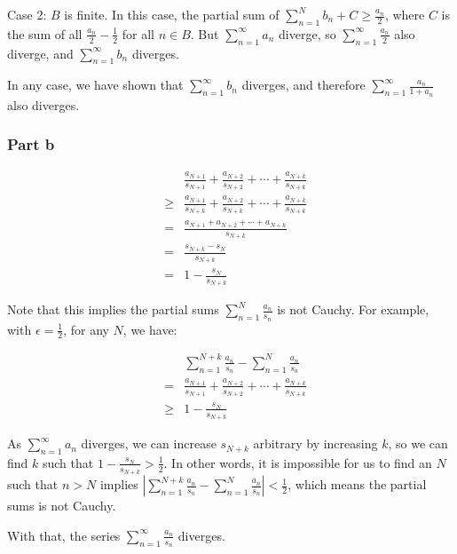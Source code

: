 Case 2: $ B $ is finite. In this case, the partial sum of $ \sum\limits_{n=1}^{N} b_n + C \ge \frac{a_n}{2} $, where $ C $ is the sum of all $ \frac{a_n}{2} - \frac{1}{2} $ for all $ n \in B $. But $  \sum\limits_{n=1}^{\infty} a_n $ diverge, so $  \sum\limits_{n=1}^{\infty} \frac{a_n}{2} $ also diverge, and $ \sum\limits_{n=1}^{\infty} b_n $ diverges.

In any case, we have shown that $ \sum\limits_{n=1}^{\infty} b_n $ diverges, and therefore $ \sum\limits_{n=1}^{\infty} \frac{a_n}{1 + a_n} $ also diverges.

\subsubsection*{Part b}
\begin{eqnarray*}
  &   & \frac{a_{N+1}}{s_{N+1}} + \frac{a_{N+2}}{s_{N+2}} + \cdots + \frac{a_{N+k}}{s_{N+k}} \\
  &\ge& \frac{a_{N+1}}{s_{N+k}} + \frac{a_{N+2}}{s_{N+k}} + \cdots + \frac{a_{N+k}}{s_{N+k}} \\
  & = & \frac{a_{N+1} + a_{N+2} + \cdots + a_{N+k}}{s_{N+k}} \\
  & = & \frac{s_{N+k} - s_N}{s_{N+k}} \\
  & = & 1 - \frac{s_N}{s_{N+k}}
\end{eqnarray*}

Note that this implies the partial sums $ \sum\limits_{n=1}^{N} \frac{a_n}{s_n} $ is not Cauchy. For example, with $ \epsilon = \frac{1}{2} $, for any $ N $, we have:

\begin{eqnarray*}
  &   & \sum\limits_{n=1}^{N + k } \frac{a_n}{s_n} - \sum\limits_{n=1}^{N} \frac{a_n}{s_n} \\
  & = & \frac{a_{N+1}}{s_{N+1}} + \frac{a_{N+2}}{s_{N+2}} + \cdots + \frac{a_{N+k}}{s_{N+k}} \\
  &\ge& 1 - \frac{s_N}{s_{N+k}}
\end{eqnarray*}

As $ \sum\limits_{n=1}^{\infty} a_n $ diverges, we can increase $ s_{N+k} $ arbitrary by increasing $ k $, so we can find $ k $ such that $ 1 - \frac{s_N}{s_{N+k}} > \frac{1}{2} $. In other words, it is impossible for us to find an $ N $ such that $ n > N $ implies $ |\sum\limits_{n=1}^{N + k } \frac{a_n}{s_n} - \sum\limits_{n=1}^{N} \frac{a_n}{s_n}| < \frac{1}{2} $, which means the partial sums is not Cauchy.

With that, the series $ \sum\limits_{n=1}^{\infty} \frac{a_n}{s_n} $ diverges.

